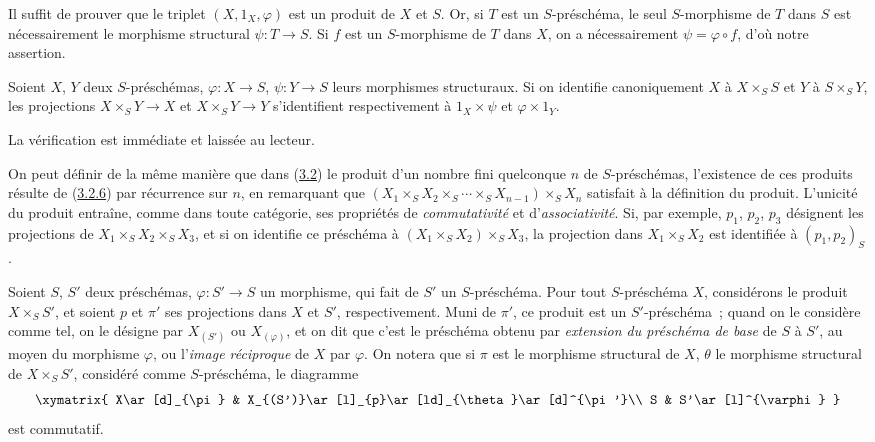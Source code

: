 Il suffit de prouver que le triplet $(X,1_X,\varphi)$ est un produit de $X$
et $S$. Or, si $T$ est un $S$-préschéma, le seul $S$-morphisme de $T$ dans
$S$ est nécessairement le morphisme structural $\psi:T\to S$. Si $f$ est
un $S$-morphisme de $T$ dans $X$, on a nécessairement
$\psi=\varphi\circ f$, d'où notre assertion.

\begin{corollary}[3.3.4]
\label{I.3.3.4-fr}
Soient $X$, $Y$ deux $S$-préschémas, $\varphi:X\to S$, $\psi:Y\to S$ leurs
morphismes structuraux. Si on identifie canoniquement $X$ à $X\times_S S$
et $Y$ à $S\times_S Y$, les projections $X\times_S Y\to X$ et
$X\times_S Y\to Y$ s'identifient respectivement à $1_X\times\psi$ et
$\varphi\times 1_Y$.
\end{corollary}

La vérification est immédiate et laissée au lecteur.

\begin{env}[3.3.5]
\label{I.3.3.5-fr}
On peut définir de la même manière que dans
(\hyperref[subsection:I.3.2-fr]{3.2}) le produit d'un
nombre fini quelconque $n$ de $S$-préschémas, l'existence de ces produits
résulte de (\hyperref[I.3.2.6-fr]{3.2.6}) par récurrence sur $n$, en remarquant
que
$(X_1\times_S X_2\times_S\cdots\times_S X_{n-1})\times_S X_n$ satisfait à
la définition du produit. L'unicité du produit entraîne, comme dans toute
catégorie, ses propriétés de \emph{commutativité} et d'\emph{associativité}.
Si, par exemple, $p_1$, $p_2$, $p_3$ désignent les projections de
$X_1\times_S X_2\times_S X_3$, et si on identifie ce préschéma à
$(X_1\times_S X_2)\times_S X_3$, la projection dans $X_1\times_S X_2$ est
identifiée à $(p_1,p_2)_S$.
\end{env}

\begin{env}[3.3.6]
\label{I.3.3.6-fr}
Soient $S$, $S'$ deux préschémas, $\varphi:S'\to S$ un morphisme, qui fait de
$S'$ un $S$-préschéma. Pour tout $S$-préschéma $X$, considérons le produit
$X\times_S S'$, et soient $p$ et $\pi'$ ses projections dans $X$ et $S'$,
respectivement. Muni de $\pi'$, ce produit est un $S'$-préschéma~; quand on le
considère comme tel, on le désigne par $X_{(S')}$ ou $X_{(\varphi)}$, et on dit
que c'est le préschéma obtenu par \emph{extension du préschéma de base} de $S$
à $S'$, au moyen du morphisme $\varphi$, ou l'\emph{image réciproque} de $X$
par $\varphi$. On notera que si $\pi$ est le morphisme structural de $X$,
$\theta$ le morphisme structural de $X\times_S S'$, considéré comme
$S$-préschéma, le diagramme
\label{I.3.3.6.base-change-diagram-fr}
\[
  \xymatrix{
    X\ar[d]_{\pi} &
    X_{(S')}\ar[l]_{p}\ar[ld]_{\theta}\ar[d]^{\pi'}\\
    S & S'\ar[l]^{\varphi}
  }
\]
est commutatif.
\end{env}


